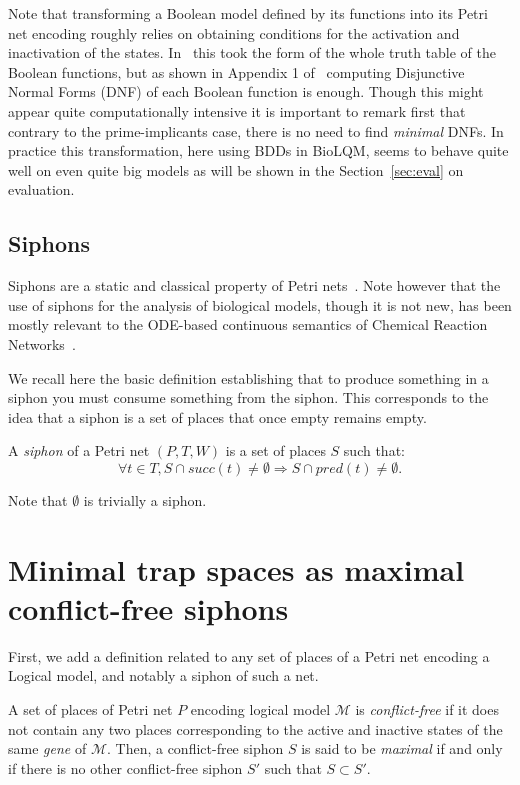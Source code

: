 \documentclass[runningheads]{llncs}
\begin{document}
Note that transforming a Boolean model defined by its functions into its Petri net encoding roughly relies on obtaining conditions for the activation and inactivation of the states. In~\cite{chaouiya2004qualitative} this took the form of the whole truth table of the Boolean functions, but as shown in Appendix 1 of~\cite{chatain2014characterization} computing Disjunctive Normal Forms (DNF) of each Boolean function is enough.
Though this might appear quite computationally intensive it is important to remark first that contrary to the prime-implicants case, there is no need to find \emph{minimal} DNFs.
In practice this transformation, here using BDDs in BioLQM, seems to behave quite well on even quite big models as will be shown in the Section~\ref{sec:eval} on evaluation.

\subsection{Siphons}

Siphons are a static and classical property of Petri nets~\cite{peterson1981petri}.
Note however that the use of siphons for the analysis of biological models, though it is not new, has been mostly relevant to the ODE-based continuous semantics of Chemical Reaction Networks~\cite{angeli2007petri,angeli2011persistence,degrand2020graphical}.

We recall here the basic definition establishing that to produce something in a siphon you must consume something from the siphon.
This corresponds to the idea that a siphon is a set of places that once empty remains empty.

\begin{definition}

  A \emph{siphon} of a Petri net \((P, T, W)\) is a set of places \(S\) such that:
  \[\forall t\in T, S\cap succ(t)\not =\emptyset\Rightarrow S\cap pred(t)\not =\emptyset.\]

\end{definition}

Note that \(\emptyset\) is trivially a siphon.

\section{Minimal trap spaces as maximal conflict-free siphons}
First, we add a definition related to any set of places of a Petri net encoding a Logical model, and notably a siphon of such a net.

\begin{definition}

  A set of places of Petri net \(P\) encoding logical model \(\mathcal{M}\) is \emph{conflict-free} if it does not contain any two places corresponding to the active and inactive states of the same \emph{gene} of \(\mathcal{M}\). Then, a conflict-free siphon \(S\) is said to be \emph{maximal} if and only if there is no other conflict-free siphon \(S'\) such that \(S \subset S'\).

\end{definition}
\end{document}

